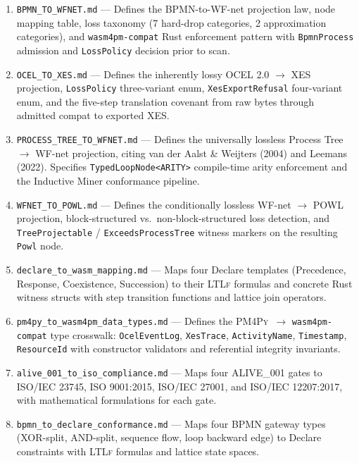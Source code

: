 \begin{enumerate}
  \item \texttt{BPMN\_TO\_WFNET.md} --- Defines the \textsc{BPMN}-to-WF-net projection law,
        node mapping table, loss taxonomy (7 hard-drop categories, 2 approximation categories),
        and \texttt{wasm4pm-compat} Rust enforcement pattern with \texttt{BpmnProcess} admission
        and \texttt{LossPolicy} decision prior to scan.
  \item \texttt{OCEL\_TO\_XES.md} --- Defines the inherently lossy \textsc{OCEL} 2.0 $\to$
        \textsc{XES} projection, \texttt{LossPolicy} three-variant enum, \texttt{XesExportRefusal}
        four-variant enum, and the five-step translation covenant from raw bytes through admitted
        compat to exported \textsc{XES}.
  \item \texttt{PROCESS\_TREE\_TO\_WFNET.md} --- Defines the universally lossless Process
        Tree $\to$ WF-net projection, citing van der Aalst \& Weijters (2004) and Leemans (2022).
        Specifies \texttt{TypedLoopNode<ARITY>} compile-time arity enforcement and the
        Inductive Miner conformance pipeline.
  \item \texttt{WFNET\_TO\_POWL.md} --- Defines the conditionally lossless WF-net $\to$
        \textsc{POWL} projection, block-structured vs.\ non-block-structured loss detection,
        and \texttt{TreeProjectable} / \texttt{ExceedsProcessTree} witness markers on the
        resulting \texttt{Powl} node.
  \item \texttt{declare\_to\_wasm\_mapping.md} --- Maps four Declare templates (Precedence,
        Response, Coexistence, Succession) to their \textsc{LTLf} formulas and concrete Rust
        witness structs with step transition functions and lattice join operators.
  \item \texttt{pm4py\_to\_wasm4pm\_data\_types.md} --- Defines the \textsc{PM4Py}~$\to$
        \texttt{wasm4pm-compat} type crosswalk: \texttt{OcelEventLog}, \texttt{XesTrace},
        \texttt{ActivityName}, \texttt{Timestamp}, \texttt{ResourceId} with constructor
        validators and referential integrity invariants.
  \item \texttt{alive\_001\_to\_iso\_compliance.md} --- Maps four \textsc{ALIVE\_001} gates to
        \textsc{ISO/IEC} 23745, \textsc{ISO} 9001:2015, \textsc{ISO/IEC} 27001, and
        \textsc{ISO/IEC} 12207:2017, with mathematical formulations for each gate.
  \item \texttt{bpmn\_to\_declare\_conformance.md} --- Maps four \textsc{BPMN} gateway types
        (XOR-split, AND-split, sequence flow, loop backward edge) to Declare constraints with
        \textsc{LTLf} formulas and lattice state spaces.
\end{enumerate}

